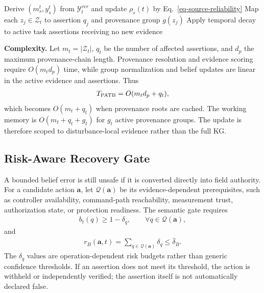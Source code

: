 \begin{algorithm}[t]
\caption{Provenance-Aware Temporal Belief Update}
\label{alg-patb}
Derive $(m_s^t,y_s^t)$ from $\mathcal{Y}_t^{ver}$ and update $\rho_s(t)$ by Eq.~\ref{eq-source-reliability}\;
Map each $z_j\in\mathcal{Z}_t$ to assertion $q_j$ and provenance group $g(z_j)$\;
Apply temporal decay to active task assertions receiving no new evidence\;
\;
\end{algorithm}

\noindent\textbf{Complexity.}
Let $m_t=|\mathcal{Z}_t|$, $q_t$ be the number of affected assertions, and $d_p$ the maximum provenance-chain length. Provenance resolution and evidence scoring require $O(m_td_p)$ time, while group normalization and belief updates are linear in the active evidence and assertions. Thus
\begin{align}
\label{eq-complexity-patb}
T_{\rm PATB}=O(m_td_p+q_t),
\end{align}
which becomes $O(m_t+q_t)$ when provenance roots are cached. The working memory is $O(m_t+q_t+g_t)$ for $g_t$ active provenance groups. The update is therefore scoped to disturbance-local evidence rather than the full KG.

\subsection{Risk-Aware Recovery Gate}
\label{subsec-risk-gate}
A bounded belief error is still unsafe if it is converted directly into field authority. For a candidate action $\mathbf{a}$, let $\mathcal{Q}(\mathbf{a})$ be its evidence-dependent prerequisites, such as controller availability, command-path reachability, measurement trust, authorization state, or protection readiness. The semantic gate requires
\begin{align}
\label{eq-gate-prerequisite}
b_t(q)\ge 1-\delta_q,\qquad \forall q\in\mathcal{Q}(\mathbf{a}),
\end{align}
and
\begin{align}
\label{eq-gate-risk-budget}
r_B(\mathbf{a},t)=\sum_{q\in\mathcal{Q}(\mathbf{a})}\delta_q\le\bar\delta_B.
\end{align}
The $\delta_q$ values are operation-dependent risk budgets rather than generic confidence thresholds. If an assertion does not meet its threshold, the action is withheld or independently verified; the assertion itself is not automatically declared false.

